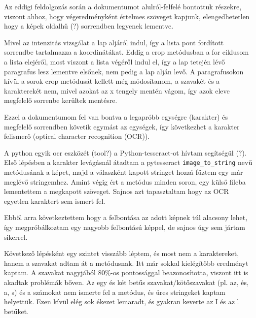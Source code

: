 Az eddigi feldolgozás során a dokumentumot alulról-felfelé bontottuk részekre, viszont ahhoz, hogy végeredményként értelmes szöveget kapjunk, elengedhetetlen hogy a képek oldalhű (?) sorrendben legyenek lementve.

Mivel az intenzitás vizsgálat a lap aljáról indul, így a lista pont fordított sorrendbe tartalmazza a koordinátákat. Eddig a crop metódusban a for ciklusom a lista elejéről, most viszont a lista végéről indul el, így a lap tetején lévő paragrafus lesz lementve elsőnek, nem pedig a lap alján levő. A paragrafusokon kívül a sorok crop metódusát kellett még módosítanom, a szavakét és a karakterekét nem, mivel azokat az x tengely mentén vágom, így azok eleve megfelelő sorrenbe kerültek mentésre. 

Ezzel a dokumentumom fel van bontva a legapróbb egységre (karakter) és megfelelő sorrendben követik egymást az egységek, így következhet a karakter felismerő (optical character recognition (OCR)).

A python egyik ocr eszközét (tool?) a Python-tesseract-ot hívtam segítségül (?). Első lépésben a karakter levágásnál átadtam a pytesseract \texttt{image\_to\_string} nevű metódusának a képet, majd a válaszként kapott stringet hozzá fűztem egy már meglévő stringemhez. Amint végig ért a metódus minden soron, egy külső fileba lementettem a megkapott szöveget. Sajnos azt tapasztaltam hogy az OCR egyetlen karaktert sem ismert fel.

Ebből arra következtettem hogy a felbontása az adott képnek túl alacsony lehet, így megpróbálkoztam egy nagyobb felbontású képpel, de sajnos úgy sem jártam sikerrel.

Következő lépésként egy szintet visszább léptem, és most nem a karaktereket, hanem a szavakat adtam át a metódusnak. Itt már sokkal kielégítőbb eredményt kaptam. A szavakat nagyjából 80\%-os pontossággal beazonosította, viszont itt is akadtak problémák bőven. Az egy és két betűs szavakat/kötőszavakat (pl. az, és, a, s) és a számokat nem ismerte fel a metódus, és üres stringeket kaptam helyettük. Ezen kívül elég sok ékezet lemaradt, és gyakran keverte az I és az l betűket. 